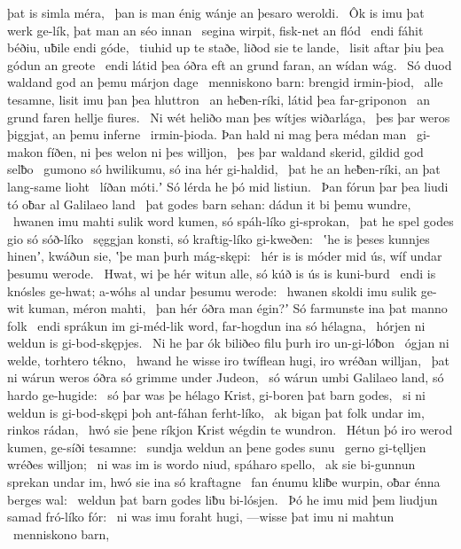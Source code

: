 þat is simla méra, \hld\ þan is man énig
wánje an þesaro weroldi. \hld\ Ôk is imu þat werk ge-lík,
þat man an séo innan \hld\ segina wirpit,
fisk-net an flód \hld\ endi fáhit béðiu,
uƀile endi góde, \hld\ tiuhid up te staðe,
liðod sie te lande, \hld\ lisit aftar þiu
þea gódun an greote \hld\ endi látid þea óðra eft an grund faran,
an wídan wág. \hld\ Só duod waldand god
an þemu márjon dage \hld\ menniskono barn:
brengid irmin-þiod, \hld\ alle tesamne,
lisit imu þan þea hluttron \hld\ an heƀen-ríki,
látid þea far-griponon \hld\ an grund faren
hellje fiures. \hld\ Ni wét heliðo man
þes wítjes wiðarlága, \hld\ þes þar weros þiggjat,
an þemu inferne \hld\ irmin-þioda.
Þan hald ni mag þera médan man \hld\ gi-makon fíðen,
ni þes welon ni þes willjon, \hld\ þes þar waldand skerid,
gildid god selƀo \hld\ gumono só hwilikumu,
só ina hér gi-haldid, \hld\ þat he an heƀen-ríki,
an þat lang-same lioht \hld\ líðan móti.ʼ
Só lérda he þó mid listiun. \hld\ Þan fórun þar þea liudi tó
oƀar al Galilaeo land \hld\ þat godes barn sehan:
dádun it bi þemu wundre, \hld\ hwanen imu mahti sulik word kumen,
só spáh-líko gi-sprokan, \hld\ þat he spel godes
gio só sóð-líko \hld\ sęggjan konsti,
só kraftig-líko gi-kweðen: \hld\ ʽhe is þeses kunnjes hinenʼ, kwáðun sie,
ʽþe man þurh mág-skępi: \hld\ hér is is móder mid ús,
wíf undar þesumu werode. \hld\ Hwat, wi þe hér witun alle,
só kúð is ús is kuni-burd \hld\ endi is knósles ge-hwat;
a-wóhs al undar þesumu werode: \hld\ hwanen skoldi imu sulik ge-wit kuman,
méron mahti, \hld\ þan hér óðra man égin?ʼ
Só farmunste ina þat manno folk \hld\ endi sprákun im gi-méd-lik word,
far-hogdun ina só hélagna, \hld\ hórjen ni weldun
is gi-bod-skępjes. \hld\ Ni he þar ók biliðeo filu
þurh iro un-gi-lóƀon \hld\ ógjan ni welde,
torhtero tékno, \hld\ hwand he wisse iro twíflean hugi,
iro wréðan willjan, \hld\ þat ni wárun weros óðra
só grimme under Judeon, \hld\ só wárun umbi Galilaeo land,
só hardo ge-hugide: \hld\ só þar was þe hélago Krist,
gi-boren þat barn godes, \hld\ si ni weldun is gi-bod-skępi þoh
ant-fáhan ferht-líko, \hld\ ak bigan þat folk undar im,
rinkos rádan, \hld\ hwó sie þene ríkjon Krist
wégdin te wundron. \hld\ Hétun þó iro werod kumen,
ge-síði tesamne: \hld\ sundja weldun
an þene godes sunu \hld\ gerno gi-tęlljen
wréðes willjon; \hld\ ni was im is wordo niud,
spáharo spello, \hld\ ak sie bi-gunnun sprekan undar im,
hwó sie ina só kraftagne \hld\ fan énumu kliƀe wurpin,
oƀar énna berges wal: \hld\ weldun þat barn godes
liƀu bi-lósjen. \hld\ Þó he imu mid þem liudjun samad
fró-líko fór: \hld\ ni was imu foraht hugi,
—wisse þat imu ni mahtun \hld\ menniskono barn,
